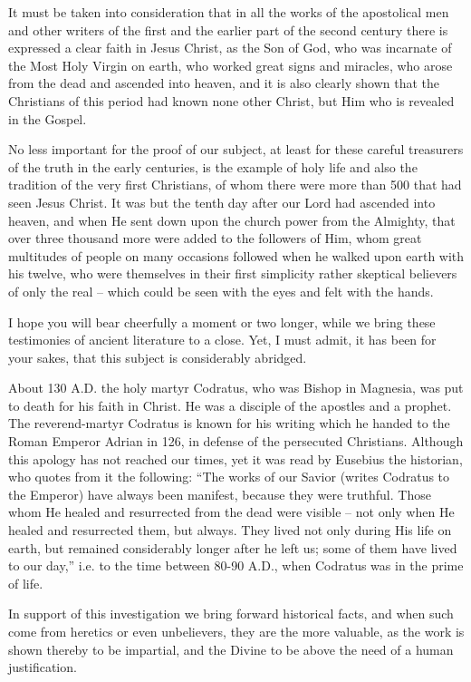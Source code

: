 It must be taken into consideration that in all the works of the apostolical men and other writers of the first and the earlier part of the second century there is expressed a clear faith in Jesus Christ, as the Son of God, who was incarnate of the Most Holy Virgin on earth, who worked great signs and miracles, who arose from the dead and ascended into heaven, and it is also clearly shown that the Christians of this period had known none other Christ, but Him who is revealed in the Gospel.

No less important for the proof of our subject, at least for these careful treasurers of the truth in the early centuries, is the example of holy life and also the tradition of the very first Christians, of whom there were more than 500 that had seen Jesus Christ. It was but the tenth day after our Lord had ascended into heaven, and when He sent down upon the church power from the Almighty, that over three thousand more were added to the followers of Him, whom great multitudes of people on many occasions followed when he walked upon earth with his twelve, who were themselves in their first simplicity rather skeptical believers of only the real -- which could be seen with the eyes and felt with the hands.

I hope you will bear cheerfully a moment or two longer, while we bring these testimonies of ancient literature to a close. Yet, I must admit, it has been for your sakes, that this subject is considerably abridged.

About 130 A.D. the holy martyr Codratus, who was Bishop in Magnesia, was put to death for his faith in Christ. He was a disciple of the apostles and a prophet. The reverend-martyr Codratus is known for his writing which he handed to the Roman Emperor Adrian in 126, in defense of the persecuted Christians. Although this apology has not reached our times, yet it was read by Eusebius the historian, who quotes from it the following: ``The works of our Savior (writes Codratus to the Emperor) have always been manifest, because they were truthful. Those whom He healed and resurrected from the dead were visible -- not only when He healed and resurrected them, but always. They lived not only during His life on earth, but remained considerably longer after he left us; some of them have lived to our day,'' i.e. to the time between 80-90 A.D., when Codratus was in the prime of life.

In support of this investigation we bring forward historical facts, and when such come from heretics or even unbelievers, they are the more valuable, as the work is shown thereby to be impartial, and the Divine to be above the need of a human justification.

